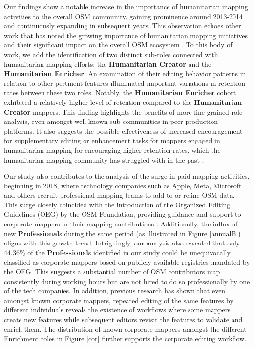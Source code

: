 \documentclass[manuscript,screen,review]{acmart}
\begin{document}
Our findings show a notable increase in the importance of humanitarian mapping activities to the overall OSM community, gaining prominence around 2013-2014 and continuously expanding in subsequent years. 
This observation echoes other work that has noted the growing importance of humanitarian mapping initiatives and their significant impact on the overall OSM ecosystem \cite{herfort2021evolution,palen15}. 
To this body of work, we add the identification of two distinct sub-roles connected with humanitarian mapping efforts: the \textbf{Humanitarian Creator} and the \textbf{Humanitarian Enricher}. 
An examination of their editing behavior patterns in relation to other pertinent features illuminated important variations in retention rates between these two roles. Notably, the \textbf{Humanitarian Enricher} cohort exhibited a relatively higher level of retention compared to the \textbf{Humanitarian Creator} mappers. 
This finding highlights the benefits of more fine-grained role analysis, even amongst well-known sub-communities in peer production platforms. 
It also suggests the possible effectiveness of increased encouragement for supplementary editing or enhancement tasks for mappers engaged in humanitarian mapping for encouraging higher retention rates, which the humanitarian mapping community has struggled with in the past \cite{dittus16, Mahmud22}.

Our study also contributes to the analysis of the surge in paid mapping activities, beginning in 2018, where technology companies such as Apple, Meta, Microsoft and others recruit professional mapping teams to add to or refine OSM data. 
This surge closely coincided with the introduction of the Organized Editing Guidelines (OEG) by the OSM Foundation, providing guidance and support to corporate mappers in their mapping contributions \cite{Veselovsky22, Chapman13}. 
Additionally, the influx of new \textbf{Professional}s during the same period (as illustrated in Figure \ref{annualB}) aligns with this growth trend. 
Intriguingly, our analysis also revealed that only 44.36\% of the \textbf{Professional}s identified in our study could be unequivocally classified as corporate mappers based on publicly available registries mandated by the OEG. 
This suggests a substantial number of OSM contributors map consistently during working hours but are not hired to do so professionally by one of the tech companies. 
In addition, previous research\cite{sarkar21} has shown that even amongst known corporate mappers, repeated editing of the same features by different individuals reveals the existence of workflows where some mappers create new features while subsequent editors revisit the features to validate and enrich them. 
The distribution of known corporate mappers amongst the different Enrichment roles in Figure \ref{cor} further supports the corporate editing workflow.
\end{document}
